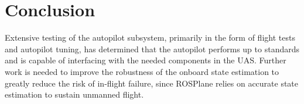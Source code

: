 \documentclass[]{auvsi_doc}
\begin{document}
\section{Conclusion}

Extensive testing of the autopilot subsystem, primarily in the form of flight tests and autopilot tuning, has determined that the autopilot performs up to standards and is capable of interfacing with the needed components in the UAS. Further work is needed to improve the robustness of the onboard state estimation to greatly reduce the risk of in-flight failure, since ROSPlane relies on accurate state estimation to sustain unmanned flight.
\end{document}
